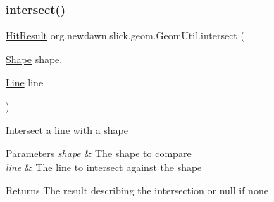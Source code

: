 \subsubsection{\texorpdfstring{intersect()}{intersect()}}
{\footnotesize\ttfamily \mbox{\hyperlink{classorg_1_1newdawn_1_1slick_1_1geom_1_1_geom_util_classorg_1_1newdawn_1_1slick_1_1geom_1_1_geom_util_1_1_hit_result}{Hit\+Result}} org.\+newdawn.\+slick.\+geom.\+Geom\+Util.\+intersect (\begin{DoxyParamCaption}\item[{\mbox{\hyperlink{classorg_1_1newdawn_1_1slick_1_1geom_1_1_shape}{Shape}}}]{shape,  }\item[{\mbox{\hyperlink{classorg_1_1newdawn_1_1slick_1_1geom_1_1_line}{Line}}}]{line }\end{DoxyParamCaption})\hspace{0.3cm}{\ttfamily [inline]}}

Intersect a line with a shape


\begin{DoxyParams}{Parameters}
{\em shape} & The shape to compare \\
\hline
{\em line} & The line to intersect against the shape \\
\hline
\end{DoxyParams}
\begin{DoxyReturn}{Returns}
The result describing the intersection or null if none 
\end{DoxyReturn}

